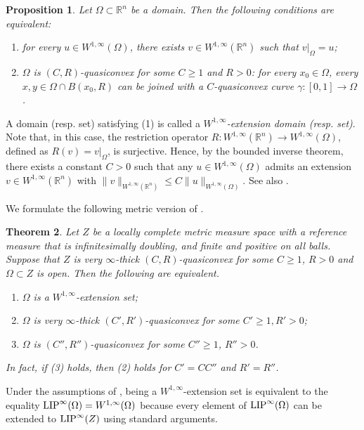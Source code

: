 \documentclass[reqno]{amsart}
\newcommand{\LIP}{{\rm LIP}}
\numberwithin{equation}{section}
\newtheorem{theorem}{Theorem}[section]
\newtheorem{proposition}[theorem]{Proposition}
\theoremstyle{remark}
\newcommand{\R}{\mathbb{R}}
\begin{document}
\begin{proposition}{\cite[Theorem 7]{HKT2008}}\label{prop:HKT2008}
    Let $\Omega\subset\R^n$ be a domain. Then the following conditions are equivalent:
    \begin{enumerate}
        \item for every $u\in W^{1,\infty}(\Omega)$, there exists $v\in W^{1,\infty}(\R^n)$ such that $v|_{\Omega}=u$;
        \item $\Omega$ is $(C,R)$-quasiconvex for some $C \geq 1$ and $R > 0$: for every $x_0 \in \Omega$, every $x, y \in \Omega \cap B( x_0, R )$ can be joined with a $C$-quasiconvex curve $\gamma \colon [0,1] \rightarrow \Omega$.
  \end{enumerate}
\end{proposition}


A domain (resp. set) satisfying  (1) is called a \emph{$W^{1,\infty}$-extension domain (resp. set)}.  Note that, in this case, the restriction operator $R:W^{1,\infty}(\R^n)\to W^{1,\infty}(\Omega)$, defined as $R(v)=v|_{\Omega}$, is surjective. Hence, by the bounded inverse theorem, there exists a constant $C>0$ such that any $u\in W^{1,\infty}(\Omega)$ admits an extension $v\in W^{1,\infty}(\R^n)$ with $\|v\|_{W^{1,\infty}(\R^n)}\leq C\|u\|_{W^{1,\infty}(\Omega)}$. See also .

We formulate the following metric version of .
\begin{theorem}\label{thm:Main_inf.ext.}
Let $Z$ be a locally complete metric measure space with a reference measure that is infinitesimally doubling, and finite and positive on all balls. Suppose that $Z$ is very $\infty$-thick $(C,R)$-quasiconvex for some $C\geq 1$, $R>0$ and $\Omega \subset Z$ is open. Then the following are equivalent.
\begin{enumerate}
    \item $\Omega$ is a $W^{1,\infty}$-extension set;
    \item $\Omega$ is very $\infty$-thick $( C', R' )$-quasiconvex for some $C' \geq 1, R' > 0$;
    \item $\Omega$ is $(C'',R'')$-quasiconvex for some $C''\geq 1$, $R''>0$.
\end{enumerate}
In fact, if (3) holds, then (2) holds for $C' = CC''$ and $R' = R''$.
\end{theorem}
Under the assumptions of , being a $W^{1,\infty}$-extension set is equivalent to the equality $\LIP^{\infty}(\Omega) = W^{1,\infty}(\Omega)$ because every element of $\LIP^{\infty}(\Omega)$ can be extended to $\LIP^{\infty}(Z)$ using standard arguments.
\end{document}
